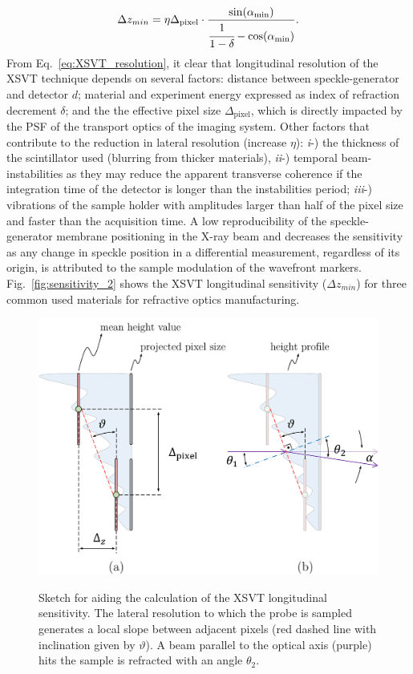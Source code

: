 \begin{refsection}
\begin{align}\label{eq:XSVT_resolution}
\Delta{z_{min}}=\eta\Delta_\text{pixel}\cdot\frac{\sin(\alpha_\text{min})}{\cfrac{1}{1-\delta}-\cos(\alpha_\text{min})}.
\end{align}
From Eq.~\ref{eq:XSVT_resolution}, it clear that longitudinal resolution of the XSVT technique depends on several factors: distance between speckle-generator and detector $d$; material and experiment energy expressed as index of refraction decrement $\delta$; and the the effective pixel size $\Delta_\text{pixel}$, which is directly impacted by the PSF of the transport optics of the imaging system. Other factors that contribute to the reduction in lateral resolution (increase $\eta$): \textit{i}-) the thickness of the scintillator used (blurring from thicker materials), \textit{ii}-) temporal beam-instabilities as they may reduce the apparent transverse coherence if the integration time of the detector is longer than the instabilities period; \textit{iii}-) vibrations of the sample holder with amplitudes larger than half of the pixel size and faster than the acquisition time. A low reproducibility of the speckle-generator membrane positioning in the X-ray beam and decreases the sensitivity as any change in speckle position in a differential measurement, regardless of its origin, is attributed to the sample modulation of the wavefront markers. Fig.~\ref{fig:sensitivity_2} shows the XSVT longitudinal sensitivity ($\Delta{z_{min}}$) for three common used materials for refractive optics manufacturing. 

\begin{figure}[t]
        \centering
        {\includegraphics[width=0.5\linewidth]{figures/ch04b/sensitivity.pdf}}
        \caption[XSVT sensitivity calculation sketch]{Sketch for aiding the calculation of the XSVT longitudinal sensitivity. The lateral resolution to which the probe is sampled generates a local slope between adjacent pixels (red dashed line with inclination given by $\vartheta$). A beam parallel to the optical axis (purple) hits the sample is refracted with an angle $\theta_2$.}\label{fig:sensitivity}
\end{figure}


\end{refsection}
